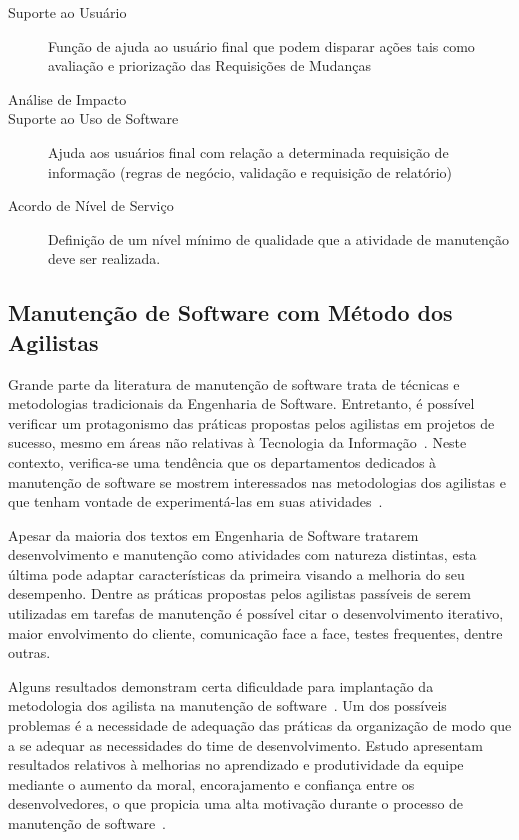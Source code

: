 \begin{description}
	\item[Suporte ao Usuário] Função de ajuda ao usuário final
		que podem disparar ações tais como avaliação e priorização das
		Requisições de Mudanças
   	\item [Análise de Impacto] 
   	\item [Suporte ao Uso de Software] Ajuda aos
		usuários final com relação a determinada requisição de informação
		(regras de negócio, validação e requisição de relatório)
	\item [Acordo de Nível de Serviço] Definição de um nível mínimo de qualidade que a
		atividade de manutenção deve ser realizada.
\end{description}

\subsection{Manutenção de Software com Método dos Agilistas}
\label{sub:manutenção_de_software_com_método_dos_agilistas}

Grande parte da literatura de manutenção de software trata de técnicas e
metodologias tradicionais da Engenharia de Software. Entretanto, é possível
verificar um protagonismo das práticas propostas pelos agilistas em projetos de
sucesso, mesmo em áreas não relativas à Tecnologia da
Informação~\cite{Serrador2015}. Neste contexto, verifica-se uma tendência que os
departamentos dedicados à manutenção de software se mostrem interessados nas
metodologias dos agilistas e que tenham vontade de experimentá-las em suas
atividades~\cite{Heeager2015}.

Apesar da maioria dos textos em Engenharia de Software tratarem desenvolvimento
e manutenção como atividades com natureza distintas, esta última pode adaptar
características da primeira visando a melhoria do seu desempenho. Dentre as
práticas propostas pelos agilistas passíveis de serem utilizadas em tarefas de
manutenção é possível citar o desenvolvimento iterativo, maior envolvimento do
cliente, comunicação face a face, testes frequentes, dentre outras.

Alguns resultados demonstram certa dificuldade para implantação da metodologia
dos agilista na manutenção de software~\cite{1402140}. Um dos possíveis
problemas é a necessidade de adequação das práticas da organização de modo que a
se adequar as necessidades do time de desenvolvimento.  Estudo apresentam
resultados relativos à melhorias no aprendizado e produtividade da equipe
mediante o aumento da moral, encorajamento e confiança entre os desenvolvedores,
o que propicia uma alta motivação durante o processo de manutenção de
software~\cite{Choudhari:2014:EIM:2557833.2557845}.

